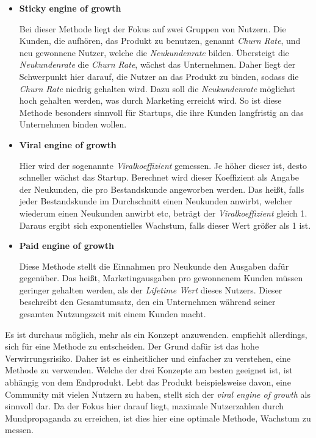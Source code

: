 \begin{itemize}
	\item \textbf{Sticky engine of growth}
	
	Bei dieser Methode liegt der Fokus auf zwei Gruppen von Nutzern. Die Kunden, die aufhören, das Produkt zu benutzen, genannt \textit{Churn Rate}, und neu gewonnene Nutzer, welche die \textit{Neukundenrate} bilden. Übersteigt die \textit{Neukundenrate} die \textit{Churn Rate}, wächst das Unternehmen. Daher liegt der Schwerpunkt hier darauf, die Nutzer an das Produkt zu binden, sodass die \textit{Churn Rate} niedrig gehalten wird. Dazu soll die \textit{Neukundenrate} möglichst hoch gehalten werden, was durch Marketing erreicht wird. So ist diese Methode besonders sinnvoll für Startups, die ihre Kunden langfristig an das Unternehmen binden wollen.
	\item \textbf{Viral engine of growth}
	
	Hier wird der sogenannte \textit{Viralkoeffizient} gemessen. Je höher dieser ist, desto schneller wächst das Startup. Berechnet wird dieser Koeffizient als Angabe der Neukunden, die pro Bestandskunde angeworben werden. Das heißt, falls jeder Bestandskunde im Durchschnitt einen Neukunden anwirbt, welcher wiederum einen Neukunden anwirbt etc, beträgt der \textit{Viralkoeffizient} gleich 1. Daraus ergibt sich exponentielles Wachstum, falls dieser Wert größer als 1 ist.
	\item \textbf{Paid engine of growth}
	
	Diese Methode stellt die Einnahmen pro Neukunde den Ausgaben dafür gegenüber. Das heißt, Marketingausgaben pro gewonnenem Kunden müssen geringer gehalten werden, als der \textit{Lifetime Wert} dieses Nutzers. Dieser beschreibt den Gesamtumsatz, den ein Unternehmen während seiner gesamten Nutzungszeit mit einem Kunden macht.
\end{itemize}

Es ist durchaus möglich, mehr als ein Konzept anzuwenden. \citeauthor{TheLeanStartup} empfiehlt allerdings, sich für eine Methode zu entscheiden. Der Grund dafür ist das hohe Verwirrungsrisiko. Daher ist es einheitlicher und einfacher zu verstehen, eine Methode zu verwenden. Welche der drei Konzepte am besten geeignet ist, ist abhängig von dem Endprodukt. Lebt das Produkt beispielsweise davon, eine Community mit vielen Nutzern zu haben, stellt sich der \textit{viral engine of growth} als sinnvoll dar. Da der Fokus hier darauf liegt, maximale Nutzerzahlen durch Mundpropaganda zu erreichen, ist dies hier eine optimale Methode, Wachstum zu messen.
\cite{TheLeanStartup}